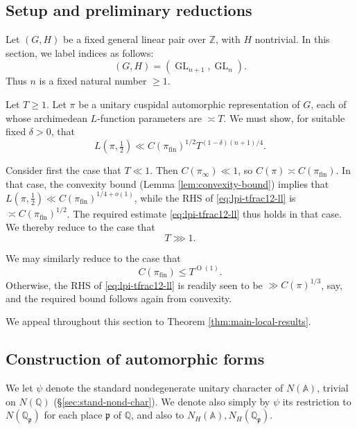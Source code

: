 \documentclass[reqno]{amsart}
\DeclareMathOperator{\GL}{GL}
\def\O{\operatorname{O}}
\DeclareMathOperator{\fin}{fin}
\theoremstyle{plain} \newtheorem{theorem} {Theorem}
\theoremstyle{definition} \newtheorem{definition} [theorem] {Definition}
\theoremstyle{itplain} %
\numberwithin{equation}{section}
\numberwithin{theorem}{section}
\renewcommand{\geq}{\geqslant}
\renewcommand{\leq}{\leqslant}
\begin{document}
\subsection{Setup and preliminary reductions}\label{sec:setup-prel-reduct}
Let $(G,H)$ be a fixed general linear pair over $\mathbb{Z}$, with $H$ nontrivial.  In this section, we label indices as follows:
\begin{equation*}
  (G,H) = (\GL_{n+1}, \GL_n).
\end{equation*}
Thus $n$ is a fixed natural number $\geq 1$.

Let $T \geq 1$.  Let $\pi$ be a unitary cuspidal automorphic representation of $G$, each of whose archimedean $L$-function parameters are $\asymp T$.  We must show, for suitable fixed $\delta > 0$, that
\begin{equation}\label{eq:lpi-tfrac12-ll}
  L(\pi,\tfrac{1}{2}) \ll C(\pi_{\fin})^{1/2} T^{(1 - \delta) (n+1)/4}.
\end{equation}

Consider first the case that $T \ll 1$.  Then $C(\pi_\infty) \ll 1$, so $C(\pi) \asymp C(\pi_{\fin})$.  In that case, the convexity bound (Lemma \ref{lem:convexity-bound}) implies that $L(\pi,\tfrac{1}{2}) \ll C(\pi_{\fin})^{1/4 + o(1)}$, while the RHS of \eqref{eq:lpi-tfrac12-ll} is $\asymp C(\pi_{\fin})^{1/2}$.  The required estimate \eqref{eq:lpi-tfrac12-ll} thus holds in that case.  We thereby reduce to the case that
\begin{equation}\label{eq:t-ggg-1}
T \ggg 1.
\end{equation}

We may similarly reduce to the case that
\begin{equation}\label{eq:n_pi-=-to1}
  C(\pi_{\fin}) \leq T^{\O(1)}.
\end{equation}
Otherwise, the RHS of \eqref{eq:lpi-tfrac12-ll} is readily seen to be $\gg C(\pi)^{1/3}$, say, and the required bound follows again from convexity.

We appeal throughout this section to Theorem \ref{thm:main-local-results}.

\subsection{Construction of automorphic forms}\label{sec:constr-autom-forms}
We let $\psi$ denote the standard nondegenerate unitary character of $N(\mathbb{A})$, trivial on $N(\mathbb{Q})$ (\S\ref{sec:stand-nond-char}).  We denote also simply by $\psi$ its restriction to $N(\mathbb{Q}_\mathfrak{p})$ for each place $\mathfrak{p}$ of $\mathbb{Q}$, and also to $N_H(\mathbb{A}), N_H(\mathbb{Q}_\mathfrak{p})$.
\end{document}
